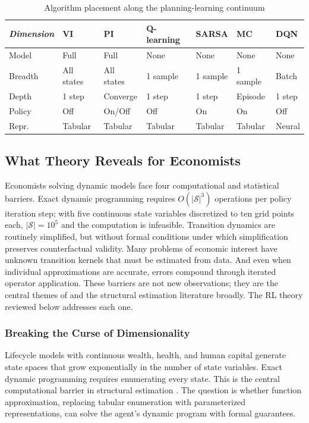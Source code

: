 \begin{table}[h!]
\centering
\caption{Algorithm placement along the planning-learning continuum}
\label{tab:algorithm-comparison}
\begin{tabular}{p{2.0cm}|p{1.5cm}p{1.5cm}p{1.5cm}p{1.5cm}p{1.5cm}p{1.5cm}}
\hline
\textit{Dimension} & VI & PI & Q-learning & SARSA & MC & DQN \\
\hline
Model & Full & Full & None & None & None & None \\
\hline
Breadth & All states & All states & 1 sample & 1 sample & 1 sample & Batch \\
\hline
Depth & 1 step & Converge & 1 step & 1 step & Episode & 1 step \\
\hline
Policy & Off & On/Off & Off & On & On & Off \\
\hline
Repr. & Tabular & Tabular & Tabular & Tabular & Tabular & Neural \\
\hline
\end{tabular}
\end{table}


\subsection{What Theory Reveals for Economists}

Economists solving dynamic models face four computational and statistical barriers. Exact dynamic programming requires $O(|\mathcal{S}|^3)$ operations per policy iteration step; with five continuous state variables discretized to ten grid points each, $|\mathcal{S}| = 10^5$ and the computation is infeasible. Transition dynamics are routinely simplified, but without formal conditions under which simplification preserves counterfactual validity. Many problems of economic interest have unknown transition kernels that must be estimated from data. And even when individual approximations are accurate, errors compound through iterated operator application. These barriers are not new observations; they are the central themes of \citet{Rust1987} and the structural estimation literature broadly. The RL theory reviewed below addresses each one.

\subsubsection{Breaking the Curse of Dimensionality}

Lifecycle models with continuous wealth, health, and human capital generate state spaces that grow exponentially in the number of state variables. Exact dynamic programming requires enumerating every state. This is the central computational barrier in structural estimation \citep{Rust1987}. The question is whether function approximation, replacing tabular enumeration with parameterized representations, can solve the agent's dynamic program with formal guarantees.

